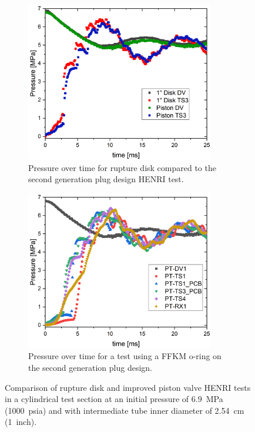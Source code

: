 \begin{figure}[tb]
    \vspace{16pt}
    \centering
    \begin{subfigure}[t]{0.45\textwidth}
        \centering
        \includegraphics[width=0.9\textwidth]{results/plots/BD_Piston_1000_overlay.png}
        \caption{Pressure over time for rupture disk compared to the second generation plug design HENRI test.}
        \label{fig:disk new}
    \end{subfigure}
    \hfill
    \begin{subfigure}[t]{0.45\textwidth}
        \centering
        \includegraphics[width=0.9\textwidth]{results/plots/1000psi_Mpa_25.png}
        \caption{Pressure over time for a test using a FFKM o-ring on the second generation plug design.}
        \label{fig:piston 1000psi 25ms}
    \end{subfigure}
    
    \caption{Comparison of rupture disk and improved piston valve HENRI tests in a cylindrical test section at an initial pressure of \SI{6.9}{\mega\pascal} (\SI{1000}{psia}) and with intermediate tube inner diameter of \SI{2.54}{\centi\meter} (\SI{1}{inch}).}
    \label{fig:new piston v disk}
    \vspace{16pt}
\end{figure}



